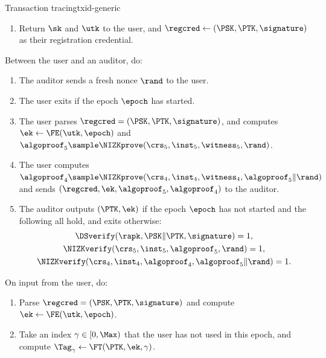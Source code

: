 \begin{protocolbox}{Transaction tracing}{txid-generic}
\begin{description}
\begin{enumerate}
	\item Return $\sk$ and $\utk$ to the user, and $\regcred \leftarrow
(\PSK,\PTK,\signature)$ as their registration credential.

      \end{enumerate}

    \item[$(\PTK,\ek) \sample \IDgrant(\crs,\sk,\utk,\regcred,\epoch)$ :]
Between the user and an auditor, do:

      \begin{enumerate}

	\item The auditor sends a fresh nonce $\rand$ to the user.

	\item The user exits if the epoch $\epoch$ has started.

	\item The user parses $\regcred = (\PSK,\PTK,\signature)$, and computes
$\ek \leftarrow \FE(\utk,\epoch)$ and $\algoproof_5 \sample
\NIZKprove(\crs_5,\inst_5,\witness_5,\rand)$.

	\item The user computes $\algoproof_4 \sample
\NIZKprove(\crs_4,\inst_4,\witness_4,\algoproof_5\|\rand)$ and sends
$(\regcred,\ek,\algoproof_5,\algoproof_4)$ to the auditor.

	\item The auditor outputs $(\PTK,\ek)$ if the epoch $\epoch$ has not
started and the following all hold, and exits otherwise:
	  \begin{gather*}
	    \DSverify(\rapk,\PSK\|\PTK,\signature) = 1, \\
	    \NIZKverify(\crs_5,\inst_5,\algoproof_5,\rand) = 1, \\
	    \NIZKverify(\crs_4,\inst_4,\algoproof_4,\algoproof_5\|\rand) = 1.
	  \end{gather*}

      \end{enumerate}

    \item[$\tx \sample \IDsubmit(\crs,\sk,\utk,\regcred,\epoch,\payload)$ :] On
input from the user, do:

      \begin{enumerate}

	\item Parse $\regcred = (\PSK,\PTK,\signature)$ and compute $\ek
\leftarrow \FE(\utk,\epoch)$.

	\item Take an index $\gamma \in [0,\Max)$ that the user has not used in
this epoch, and compute $\Tag_\gamma \leftarrow
\FT(\PTK,\ek,\gamma)$.


\end{enumerate}
\end{description}
\end{protocolbox}
